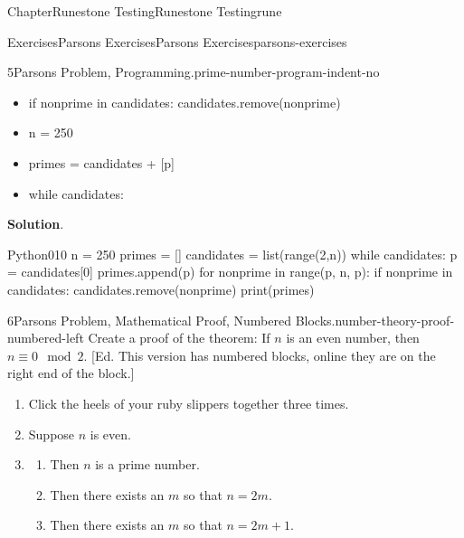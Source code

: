 \documentclass[oneside,10pt,]{book}
\newcommand{\blocktitlefont}{\relax}
\numberwithin{equation}{section}
\begin{document}
\begin{chapterptx}{Chapter}{Runestone Testing}{}{Runestone Testing}{}{}{rune}
\begin{exercises-section}{Exercises}{Parsons Exercises}{}{Parsons Exercises}{}{}{parsons-exercises}
\begin{divisionexercise}{5}{Parsons Problem, Programming.}{}{prime-number-program-indent-no}
\begin{itemize}[label=\textbullet]
\begin{codedisplayleft}[showspaces=true]
print(primes)
\end{codedisplayleft}
%
\item{}%
\begin{codedisplayleft}[showspaces=true]
        if nonprime in candidates:
            candidates.remove(nonprime)
\end{codedisplayleft}
%
\item{}%
\begin{codedisplayleft}[showspaces=true]
n = 250
\end{codedisplayleft}
%
\item{}%
\begin{codedisplayleft}[showspaces=true]
primes = candidates + [p]
\end{codedisplayleft}
%
\item{}%
\begin{codedisplayleft}[showspaces=true]
while candidates:
\end{codedisplayleft}
%
\end{itemize}
%
\par\smallskip%
\noindent\textbf{\blocktitlefont Solution}.\hypertarget{prime-number-program-indent-no-5}{}\quad{}\begin{program}{Python}{0}{1}{0}
n = 250
primes = []
candidates = list(range(2,n))
while candidates:
    p = candidates[0]
    primes.append(p)
    for nonprime in range(p, n, p):
        if nonprime in candidates:
            candidates.remove(nonprime)
print(primes)
\end{program}
\end{divisionexercise}%
\begin{divisionexercise}{6}{Parsons Problem, Mathematical Proof, Numbered Blocks.}{}{number-theory-proof-numbered-left}%
%
Create a proof of the theorem: If \(n\) is an even number, then \(n\equiv 0\mod 2\). [Ed.  This version has numbered blocks, online they are on the right end of the block.]%
\par
%
\begin{enumerate}[label={\arabic*.}]
\item{}Click the heels of your ruby slippers together three times.%
\item{}Suppose \(n\) is even.%
\item{}%
\begin{enumerate}[label={(\alph*)}]
\item{}Then \(n\) is a prime number.%
\item{}Then there exists an \(m\) so that \(n = 2m\).%
\item{}Then there exists an \(m\) so that \(n = 2m + 1\).%

\end{enumerate}
\end{enumerate}
\end{divisionexercise}
\end{exercises-section}
\end{chapterptx}
\end{document}
